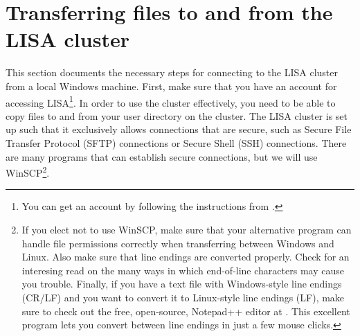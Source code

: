 \section{Transferring files to and from the LISA cluster}

This section documents the necessary steps for connecting to the LISA cluster from a local Windows machine. First, make sure that you have an account for accessing LISA\footnote{You can get an account by following the instructions from .}. In order to use the cluster effectively, you need to be able to copy files to and from your user directory on the cluster. The LISA cluster is set up such that it exclusively allows connections that are secure, such as Secure File Transfer Protocol (SFTP) connections or Secure Shell (SSH) connections. There are many programs that can establish secure connections, but we will use WinSCP\footnote{If you elect not to use WinSCP, make sure that your alternative program can handle file permissions correctly when transferring between Windows and Linux. Also make sure that line endings are converted properly. Check  for an interesing read on the many ways in which end-of-line characters may cause you trouble. Finally, if you have a text file with Windows-style line endings (CR/LF) and you want to convert it to Linux-style line endings (LF), make sure to check out the free, open-source, Notepad++ editor at . This excellent program lets you convert between line endings in just a few mouse clicks.}.

